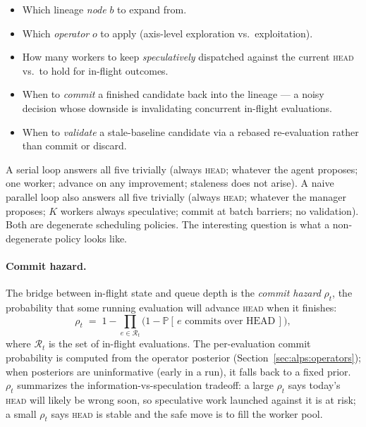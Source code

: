 \documentclass{article}
\newcommand{\HEAD}{\textsc{head}\xspace}
\begin{document}
\begin{itemize}[leftmargin=*,nosep]
\item Which lineage \emph{node} $b$ to expand from.
\item Which \emph{operator} $o$ to apply (axis-level exploration vs.\ exploitation).
\item How many workers to keep \emph{speculatively} dispatched against the current \HEAD vs.\ to hold for in-flight outcomes.
\item When to \emph{commit} a finished candidate back into the lineage — a noisy decision whose downside is invalidating concurrent in-flight evaluations.
\item When to \emph{validate} a stale-baseline candidate via a rebased re-evaluation rather than commit or discard.
\end{itemize}

A serial loop answers all five trivially (always \HEAD; whatever the agent proposes; one worker; advance on any improvement; staleness does not arise). A naive parallel loop also answers all five trivially (always \HEAD; whatever the manager proposes; $K$ workers always speculative; commit at batch barriers; no validation). Both are degenerate scheduling policies. The interesting question is what a non-degenerate policy looks like.

\paragraph{Commit hazard.}
The bridge between in-flight state and queue depth is the \emph{commit hazard} $\rho_t$, the probability that some running evaluation will advance \HEAD when it finishes:
\begin{equation}
  \rho_t \;=\; 1 - \prod_{e \in \mathcal{R}_t} \bigl(1 - \mathbb{P}\!\left[\,e \text{ commits over HEAD}\,\right]\bigr),
  \label{eq:hazard}
\end{equation}
where $\mathcal{R}_t$ is the set of in-flight evaluations. The per-evaluation commit probability is computed from the operator posterior (Section~\ref{sec:alps:operators}); when posteriors are uninformative (early in a run), it falls back to a fixed prior. $\rho_t$ summarizes the information-vs-speculation tradeoff: a large $\rho_t$ says today's \HEAD will likely be wrong soon, so speculative work launched against it is at risk; a small $\rho_t$ says \HEAD is stable and the safe move is to fill the worker pool.
\end{document}
